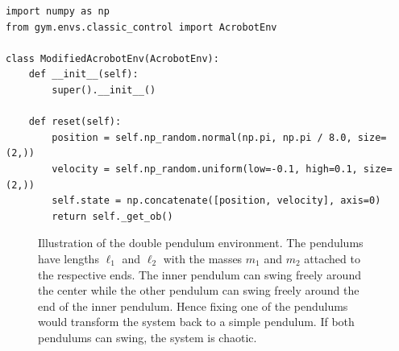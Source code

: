 		\begin{lstlisting}[caption={Modification of Gym's acrobot environment to start at the top instead of hanging down.}, label=lst:topAcrobot]
import numpy as np
from gym.envs.classic_control import AcrobotEnv

class ModifiedAcrobotEnv(AcrobotEnv):
	def __init__(self):
		super().__init__()

	def reset(self):
		position = self.np_random.normal(np.pi, np.pi / 8.0, size=(2,))
		velocity = self.np_random.uniform(low=-0.1, high=0.1, size=(2,))
		self.state = np.concatenate([position, velocity], axis=0)
		return self._get_ob()
		\end{lstlisting}

		\begin{figure}
			\centering
			\tikzDoublePendulum
			\caption{Illustration of the double pendulum environment. The pendulums have lengths \(\ell_1\) and \(\ell_2\) with the masses \(m_1\) and \(m_2\) attached to the respective ends. The inner pendulum can swing freely around the center while the other pendulum can swing freely around the end of the inner pendulum. Hence fixing one of the pendulums would transform the system back to a simple pendulum. If both pendulums can swing, the system is chaotic.}
			\label{fig:envDoublePendulumGymSketch}
		\end{figure}

